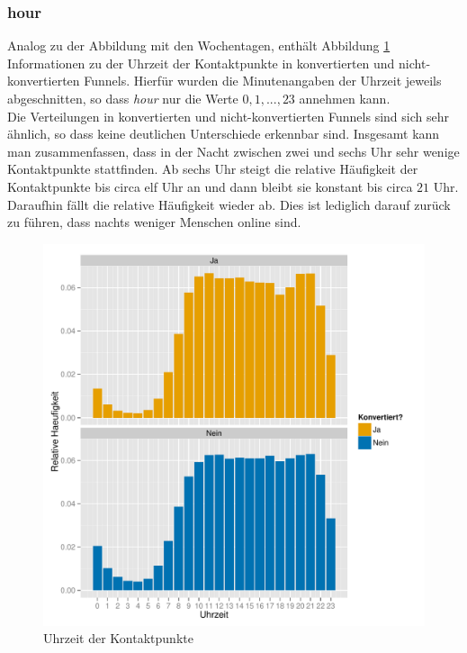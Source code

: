 \subsubsection*{hour}
Analog zu der Abbildung mit den Wochentagen, enthält Abbildung \ref{hour} Informationen zu der Uhrzeit der Kontaktpunkte in konvertierten und nicht-konvertierten Funnels. Hierfür wurden die Minutenangaben der Uhrzeit jeweils abgeschnitten, so dass \textit{hour} nur die Werte $0,1,...,23$ annehmen kann.\\
Die Verteilungen in konvertierten und nicht-konvertierten Funnels sind sich sehr ähnlich, so dass keine deutlichen Unterschiede erkennbar sind. Insgesamt kann man zusammenfassen, dass in der Nacht zwischen zwei und sechs Uhr sehr wenige Kontaktpunkte stattfinden. Ab sechs Uhr steigt die relative Häufigkeit der Kontaktpunkte bis circa elf Uhr an und dann bleibt sie konstant bis circa $21$ Uhr. Daraufhin fällt die relative Häufigkeit wieder ab. Dies ist lediglich darauf zurück zu führen, dass nachts weniger Menschen online sind.
\begin{figure}[H]
    \centering
    \includegraphics[scale=0.5]{hour.pdf}
    \caption{Uhrzeit der Kontaktpunkte}
    \label{hour}
\end{figure}

